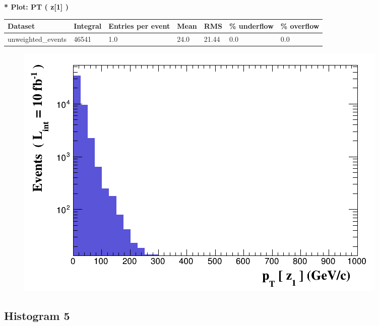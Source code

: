 \documentclass[a4paper, 10pt]{article}
\begin{document}
\textbf{* Plot: PT ( z[1] ) }\\
   \begin{table}[H]
  \begin{center}
    \begin{tabular}{|m{23.0mm}|m{23.0mm}|m{18.0mm}|m{19.0mm}|m{19.0mm}|m{19.0mm}|m{19.0mm}|}
      \hline
      {\cellcolor{yellow}         Dataset}& {\cellcolor{yellow}         Integral}& {\cellcolor{yellow}         Entries per event}& {\cellcolor{yellow}         Mean}& {\cellcolor{yellow}         RMS}& {\cellcolor{yellow}         \% underflow}& {\cellcolor{yellow}         \% overflow}\\
      \hline
      {\cellcolor{white}         unweighted\_events}& {\cellcolor{white}         46541}& {\cellcolor{white}         1.0}& {\cellcolor{white}         24.0}& {\cellcolor{white}         21.44}& {\cellcolor{green}         0.0}& {\cellcolor{green}         0.0}\\
\hline
    \end{tabular}
  \end{center}
\end{table}

\begin{figure}[H]
  \begin{center}
    \includegraphics[scale=0.45]{selection_3.png}\\
\caption{   }
  \end{center}
\end{figure}
      \newpage
\subsection{ Histogram 5}
\end{document}
